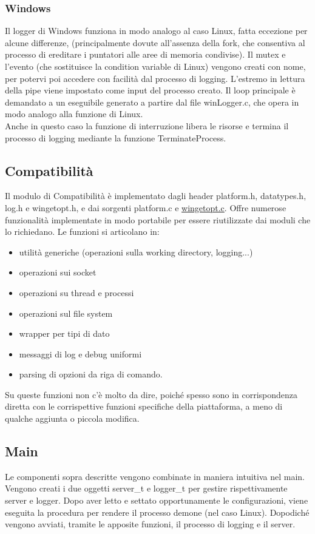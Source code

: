 \documentclass{article}
\begin{document}
\subsubsection{Windows}
Il logger di Windows funziona in modo analogo al caso Linux, fatta eccezione per alcune differenze,
(principalmente dovute all'assenza della fork, che consentiva al processo di ereditare i puntatori alle
aree di memoria condivise).
Il mutex e l'evento (che sostituisce la condition variable di Linux) vengono creati con nome, per
potervi poi accedere con facilità dal processo di logging. L'estremo in lettura della pipe viene 
impostato come input del processo creato. Il loop principale è demandato a un eseguibile
generato a partire dal file winLogger.c, che opera in modo analogo alla funzione di Linux.\\
Anche in questo caso la funzione di interruzione libera le risorse e termina il processo di logging
mediante la funzione TerminateProcess.

\subsection{Compatibilità}
Il modulo di Compatibilità è implementato dagli header platform.h, datatypes.h, log.h e wingetopt.h, e dai 
sorgenti platform.c e \href{http://note.sonots.com/Comp/CompLang/cpp/getopt.html}{wingetopt.c}.
Offre numerose funzionalità implementate in modo portabile per essere riutilizzate
dai moduli che lo richiedano. Le funzioni si articolano in:
\begin{itemize}
    \item utilità generiche (operazioni sulla working directory, logging...)
    \item operazioni sui socket
    \item operazioni su thread e processi
    \item operazioni sul file system
    \item wrapper per tipi di dato
    \item messaggi di log e debug uniformi
    \item parsing di opzioni da riga di comando.
\end{itemize}
Su queste funzioni non c'è molto da dire, poiché spesso sono in corrispondenza diretta con le corrispettive funzioni
specifiche della piattaforma, a meno di qualche aggiunta o piccola modifica.

\subsection{Main}
Le componenti sopra descritte vengono combinate in maniera intuitiva nel main.
Vengono creati i due oggetti server\_t e logger\_t per gestire rispettivamente server e logger.
Dopo aver letto e settato opportunamente le configurazioni, viene eseguita la 
procedura per rendere il processo demone (nel caso Linux). Dopodiché vengono avviati, tramite le apposite 
funzioni, il processo di logging e il server.
\end{document}
